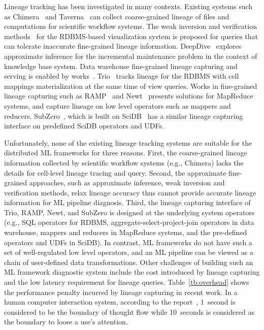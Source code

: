 \documentclass{sig-alternate}
\begin{document}
Lineage tracking has been investigated in many contexts.
Existing systems such as Chimera~\cite{foster02} and Taverna~\cite{oinn02} can collect coarse-grained lineage 
of files and computations for scientific workflow systems.
The weak inversion and verification methods~\cite{woodruff97} for the RDBMS-based visualization system 
is proposed for queries that can tolerate inaccurate fine-grained lineage information.
DeepDive~\cite{shin15} explores approximate inference for the incremental maintenance problem in the context of knowledge base system.
Data warehouse fine-grained lineage capturing and serving is enabled by works~\cite{cui00, cui03}.
Trio~\cite{widom04} tracks lineage for the RDBMS with cell mappings materialization at the same time of view queries.
Works in fine-grained lineage capturing such as RAMP~\cite{ikeda11, park11} and Newt~\cite{logothetis13} presents
solutions for MapReduce systems, and capture lineage on low level operators such as mappers and reducers.
SubZero~\cite{wu13}, which is built on SciDB~\cite{brown10} has a similar lineage capturing interface on predefined SciDB operators and UDFs.

Unfortunately, none of the existing lineage tracking systems are suitable for the distributed ML frameworks for three reasons.
First, the coarse-grained lineage information collected by scientific workflow systems (e.g., Chimera) lacks the details for cell-level lineage tracing and query.
Second, the approximate fine-grained approaches, such as approximate inference, weak inversion and verification methods, 
relax lineage accuracy thus cannot provide accurate lineage information for ML pipeline diagnosis.
Third, the lineage capturing interface of Trio, RAMP, Newt, and SubZero is designed at
the underlying system operators (e.g., SQL operators for RDBMS, aggregate-select-project-join operators in data warehouse, 
mappers and reducers in MapReduce systems, and the pre-defined operators and UDFs in SciDB). 
In contrast, ML frameworks do not have such a set of well-regulated low level operators,
and an ML pipeline can be viewed as a chain of user-defined data transformations.
Other challenges of building such an ML framework diagnostic system include the cost introduced by 
lineage capturing and the low latency requirement for lineage queries.
Table~\ref{tb:overhead} shows the performance penalty incurred by lineage capturing in recent work.
In a human computer interaction system, according to the report~\cite{nielsen2009}, 
1~second is considered to be the boundary of thought flow while 
10~seconds is considered as the boundary to loose a use's attention.
\end{document}
